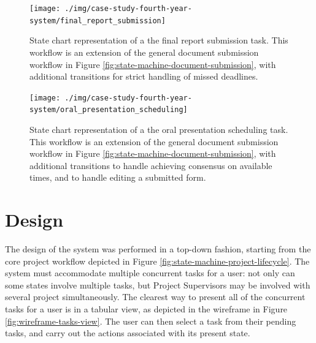 \begin{figure}[!htbp]
\centering \texttt{[image: ./img/case-study-fourth-year-system/final\_report\_submission]}
\caption{State chart representation of a the final report submission task. This workflow is an extension of the general document submission workflow in Figure \ref{fig:state-machine-document-submission}, with additional transitions for strict handling of missed deadlines.}
\label{fig:state-machine-final-report-submission}
\end{figure}

\begin{figure}[!htbp]
\centering \texttt{[image: ./img/case-study-fourth-year-system/oral\_presentation\_scheduling]}
\caption{State chart representation of a the oral presentation scheduling task. This workflow is an extension of the general document submission workflow in Figure \ref{fig:state-machine-document-submission}, with additional transitions to handle achieving consensus on available times, and to handle editing a submitted form.}
\label{fig:state-machine-oral-presentation-scheduling}
\end{figure}


\FloatBarrier

\section{Design}
\label{sec:4ys-design}

The design of the system was performed in a top-down fashion, starting from the core project workflow depicted in Figure \ref{fig:state-machine-project-lifecycle}. The system must accommodate multiple concurrent tasks for a user: not only can some states involve multiple tasks, but Project Supervisors may be involved with several project simultaneously. The clearest way to present all of the concurrent tasks for a user is in a tabular view, as depicted in the wireframe in Figure \ref{fig:wireframe-tasks-view}. The user can then select a task from their pending tasks, and carry out the actions associated with its present state.

